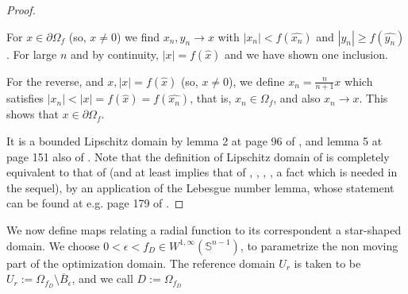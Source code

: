 \documentclass[english,a4paper,9pt,oneside]{scrbook}	%
\theoremstyle{break}
\newenvironment{mproof}[1][\proofname]{%
  \begin{proof}[#1]$ $\par\nobreak\ignorespaces
}{%
  \end{proof}
}
\renewcommand*{\proofname}{Proof}
\theoremstyle{remark}
\newcommand{\mS}{\mathbb{S}^{n-1}}
\newcommand{\xh}{\hat{x}}
\newcommand{\eps}{\epsilon}
\begin{document}
\begin{mproof}

For $x \in \partial \Omega_f$ (so, $x\neq 0$) we find $x_n, y_n \rightarrow x$ with $|x_n|<f(\widehat{x_n})$ and $|y_n|\geq f(\widehat{y_n})$. For large $n$ and by continuity, $|x| = f(\xh)$ and we have shown one inclusion.

For the reverse, and $x, |x|=f(\xh)$ (so, $x\neq 0$), we define $x_n = \frac{n}{n+1} x$ which satisfies $|x_n|<|x|=f(\xh)=f(\widehat{x_n})$, that is, $x_n \in \Omega_f$, and also $x_n\rightarrow x$. This shows that $x \in \partial \Omega_f$.

It is a bounded Lipschitz domain by lemma 2 at page 96 of \cite{burenkov}, and lemma 5 at page 151 also of \cite{burenkov}. Note that the definition of Lipschitz domain of \cite{burenkov} is completely equivalent to that of \cite{bello} (and at least implies that of \cite{mclean}, \cite{grisvard}, \cite{leoni}, \cite{adams}, a fact which is needed in the sequel), by an application of the Lebesgue number lemma, whose statement can be found at e.g. page 179 of \cite{munkres}.
\end{mproof}

We now define maps relating a radial function to its correspondent a star-shaped domain. We choose $0<\eps <f_D \in W^{1,\infty}(\mS)$, to parametrize the non moving part of the optimization domain. The reference domain $U_r$ is taken to be $U_r:=\Omega_{f_D}\setminus \overline{B}_\eps$, and we call $D:=\Omega_{f_D}$
\end{document}
